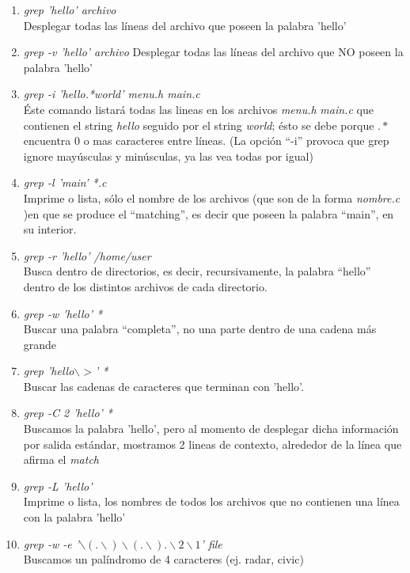 \begin{enumerate}
	\item \emph{grep 'hello' archivo}\\
	Desplegar todas las líneas del archivo que poseen la palabra 'hello'
	\item \emph{grep -v 'hello' archivo}
	Desplegar todas las líneas del archivo que NO poseen la palabra 'hello'
	\item \emph{grep -i 'hello.*world' menu.h main.c}\\
	Éste comando listará todas las lineas en los archivos \emph{menu.h}  \emph{main.c} que contienen
	el string \emph{hello} seguido por el string \emph{world};
	ésto se debe porque \emph{$.*$} encuentra 0 o mas caracteres entre líneas.
	(La opción ``-i'' provoca que grep ignore mayúsculas y minúsculas, ya las vea todas por igual)

	\item \emph{grep -l 'main' *.c}\\
	 Imprime o lista, sólo el nombre de los archivos
	 (que son de la forma \emph{nombre.c} )en que se produce el ``matching'',
	es decir que poseen la palabra ``main'', en su interior.
	 
	\item \emph{grep -r 'hello' /home/user}\\
	Busca dentro de directorios, es decir, recursivamente,
	la palabra ``hello'' dentro de los distintos archivos de cada directorio.

	\item \emph{grep -w 'hello' *}\\
	Buscar una palabra ``completa'', no una parte dentro de una cadena más grande

	\item \emph{grep 'hello$\backslash >$' *}\\
	Buscar las cadenas de caracteres que terminan con 'hello'.

	\item \emph{grep -C 2 'hello' *}\\
	Buscamos la palabra 'hello', pero al momento de desplegar dicha información por salida
	estándar, mostramos 2 lineas de contexto, alrededor de la línea que afirma el \emph{match}

	\item \emph{grep -L 'hello'}\\
	Imprime o lista, los nombres de todos los archivos que no contienen una línea con la palabra 'hello'

	\item \emph{grep -w -e '$\backslash(.\backslash)\backslash(.\backslash).\backslash2\backslash1$' file}\\
	Buscamos un palíndromo de 4 caracteres (ej. radar, civic)

\end{enumerate}

